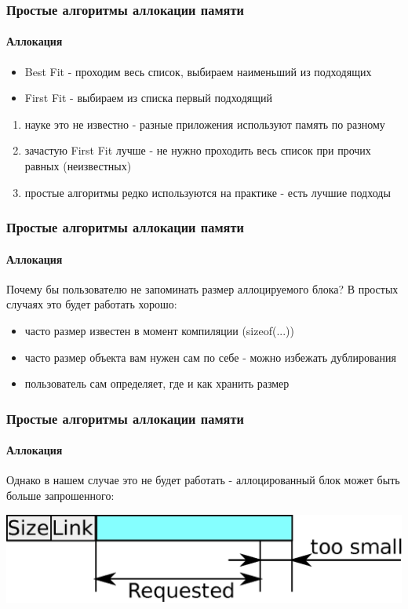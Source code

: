 \begin{frame}
\frametitle{Простые алгоритмы аллокации памяти}
\framesubtitle{Аллокация}


\begin{itemize}
  \item<3-> Best Fit - проходим весь список, выбираем наименьший из подходящих
  \item<4-> First Fit - выбираем из списка первый подходящий
\end{itemize}

\begin{enumerate}
  \item<6-> науке это не известно - разные приложения используют память по разному
  \item<7-> зачастую First Fit лучше - не нужно проходить весь список при прочих равных (неизвестных)
  \item<8-> простые алгоритмы редко используются на практике - есть лучшие подходы
\end{enumerate}
\end{frame}

\begin{frame}
\frametitle{Простые алгоритмы аллокации памяти}
\framesubtitle{Аллокация}

Почему бы пользователю не запоминать размер аллоцируемого блока? В простых случаях это будет работать хорошо:
\begin{itemize}
  \item часто размер известен в момент компиляции (sizeof(...))
  \item часто размер объекта вам нужен сам по себе - можно избежать дублирования
  \item пользователь сам определяет, где и как хранить размер
\end{itemize}
\end{frame}

\begin{frame}
\frametitle{Простые алгоритмы аллокации памяти}
\framesubtitle{Аллокация}

Однако в нашем случае это не будет работать - аллоцированный блок может быть больше запрошенного:

\includegraphics[width=.9\linewidth]{alloc-alloc1}
\end{frame}

